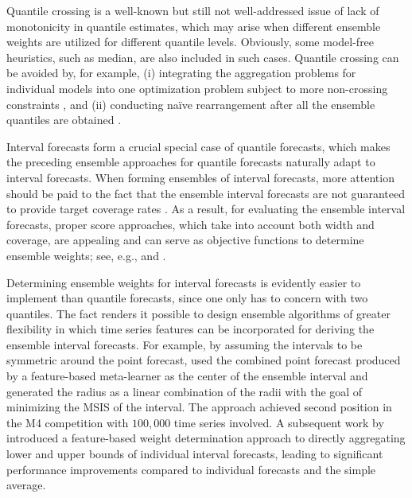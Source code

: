 \documentclass[11pt]{article}
\begin{document}
Quantile crossing is a well-known but still not well-addressed issue of lack of monotonicity in quantile estimates, which may arise when different ensemble weights are utilized for different quantile levels. Obviously, some model-free heuristics, such as median, are also included in such cases. Quantile crossing can be avoided by, for example, (i) integrating the aggregation problems for individual models into one optimization problem subject to more non-crossing constraints \citep[e.g.,][]{Kim2021-wa}, and (ii) conducting na\"{i}ve rearrangement after all the ensemble quantiles are obtained \citep[e.g.,][]{Chernozhukov2010-zz}.

Interval forecasts form a crucial special case of quantile forecasts, which makes the preceding ensemble approaches for quantile forecasts naturally adapt to interval forecasts. When forming ensembles of interval forecasts, more attention should be paid to the fact that the ensemble interval forecasts are not guaranteed to provide target coverage rates \citep{Wallis2005-yf,Timmermann2006-en,Grushka-Cockayne2020-qv}. As a result, for evaluating the ensemble interval forecasts, proper score approaches, which take into account both width and coverage, are appealing and can serve as objective functions to determine ensemble weights; see, e.g., \cite{Gneiting2007-ij} and \cite{Jose2009-lh}.

Determining ensemble weights for interval forecasts is evidently easier to implement than quantile forecasts, since one only has to concern with two quantiles. The fact renders it possible to design ensemble algorithms of greater flexibility in which time series features can be incorporated for deriving the ensemble interval forecasts. For example, by assuming the intervals to be symmetric around the point forecast, \cite{Montero-Manso2020-tq} used the combined point forecast produced by a feature-based meta-learner as the center of the ensemble interval and generated the radius as a linear combination of the radii with the goal of minimizing the MSIS \citep[mean scaled interval score,][]{Gneiting2007-ij} of the interval. The approach achieved second position in the M4 competition with $100,000$ time series involved. A subsequent work by \cite{Wang2021-un} introduced a feature-based weight determination approach to directly aggregating lower and upper bounds of individual interval forecasts, leading to significant performance improvements compared to individual forecasts and the simple average.
\end{document}
